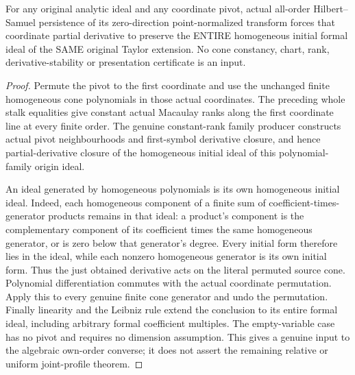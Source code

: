 \begin{theorem}
\label{hir:actual-persistent-point-source-cone-pderiv}
\leanok
For any original analytic ideal and any coordinate pivot, actual all-order
Hilbert--Samuel persistence of its zero-direction point-normalized transform
forces that coordinate partial derivative to preserve the ENTIRE homogeneous
initial formal ideal of the SAME original Taylor extension. No cone
constancy, chart, rank, derivative-stability or presentation certificate is
an input.
\end{theorem}
\begin{proof}
Permute the pivot to the first coordinate and use the unchanged finite
homogeneous cone polynomials in those actual coordinates. The preceding
whole stalk equalities give constant actual Macaulay ranks along the first
coordinate line at every finite order. The genuine constant-rank family
producer constructs actual pivot neighbourhoods and first-symbol derivative
closure, and hence partial-derivative closure of the homogeneous initial
ideal of this polynomial-family origin ideal.

An ideal generated by homogeneous polynomials is its own homogeneous
initial ideal. Indeed, each homogeneous component of a finite sum of
coefficient-times-generator products remains in that ideal: a product's
component is the complementary component of its coefficient times the same
homogeneous generator, or is zero below that generator's degree. Every
initial form therefore lies in the ideal, while each nonzero homogeneous
generator is its own initial form. Thus the just obtained derivative acts
on the literal permuted source cone. Polynomial differentiation commutes
with the actual coordinate permutation. Apply this to every genuine finite
cone generator and undo the permutation. Finally linearity and the
Leibniz rule extend the conclusion to its entire formal ideal, including
arbitrary formal coefficient multiples. The empty-variable case has no
pivot and requires no dimension assumption. This gives a genuine input to
the algebraic own-order converse; it does not assert the remaining relative
or uniform joint-profile theorem.
\end{proof}
